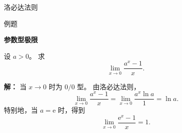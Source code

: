 \documentclass[aspectratio=169,10pt,fontset=fandol]{ctexbeamer}
\newcommand{\ee}{\mathrm{e}}
\begin{document}
\begin{frame}[t,fragile]{洛必达法则}
\normalsize
\begin{block}{例题}
{\normalsize
\textbf{参数型极限}\par

设 $a>0$。 求
\[
\lim_{x\to0}\frac{a^x-1}{x}.
\]

}
\end{block}
\pause
{\normalsize
\textbf{解：}
当 $x\to0$ 时为 $0/0$ 型。 由洛必达法则，
\[
\lim_{x\to0}\frac{a^x-1}{x}
=\lim_{x\to0}\frac{a^x\ln a}{1}
=\ln a.
\]
特别地，当 $a=\ee$ 时，得到
\[
\lim_{x\to0}\frac{\ee^x-1}{x}=1.
\]

}
\end{frame}
\end{document}
